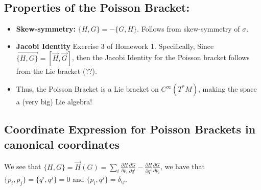 \documentclass{article}
\newcommand{\pdof}[2]{\frac{\partial #1}{\partial #2}}
\begin{document}
\subsection{Properties of the Poisson Bracket:}
\begin{itemize}
    \item \textbf{Skew-symmetry:} $\{H,G\} = -\{G,H\}$. Follows from skew-symmetry of $\sigma$.
    \item \textbf{Jacobi Identity} Exercise 3 of Homework 1. Specifically, Since $\overrightarrow{\{H,G\}} = \left[\vec H, \vec G\right]$, then the Jacobi Identity for the Poisson bracket follows from the Lie bracket (??).
    \item Thus, the Poisson Bracket is a Lie bracket on $C^\infty(T^*M)$, making the space a (very big) Lie algebra!
\end{itemize}
\subsection{Coordinate Expression for Poisson Brackets in canonical coordinates}
We see that $\{H,G\} = \vec H(G) = \sum_i\pdof{H}{p_i}\pdof{G}{q^i} - \pdof{H}{q^i}\pdof{G}{p_i}$, we have that $\{p_i,p_j\} = \{q^i,q^j\} = 0$ and $\{p_i,q^j\} = \delta_{ij}$.
\end{document}

